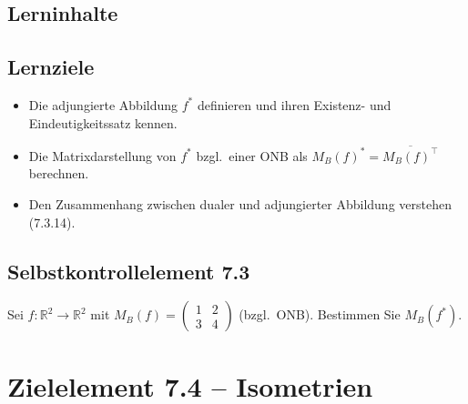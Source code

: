 \documentclass[a4paper,12pt]{article}
\begin{document}
\subsection*{Lerninhalte}
\begin{center}
\end{center}

\subsection*{Lernziele}
\begin{itemize}
  \item Die adjungierte Abbildung $f^*$ definieren und ihren Existenz- und Eindeutigkeitssatz kennen.
  \item Die Matrixdarstellung von $f^*$ bzgl.\ einer ONB als $M_B(f)^* = \overline{M_B(f)^\top}$ berechnen.
  \item Den Zusammenhang zwischen dualer und adjungierter Abbildung verstehen (7.3.14).
\end{itemize}

\subsection*{Selbstkontrollelement 7.3}
Sei $f: \mathbb{R}^2 \to \mathbb{R}^2$ mit $M_B(f) = \begin{pmatrix}1&2\\3&4\end{pmatrix}$ (bzgl.\ ONB). Bestimmen Sie $M_B(f^*)$.

\newpage

\section*{Zielelement 7.4 -- Isometrien}
\end{document}
